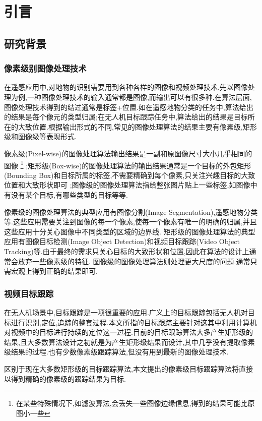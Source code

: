 
\chapter{引言}

\section{研究背景}
\subsection{像素级别图像处理技术}
在遥感应用中,对地物的识别需要用到各种各样的图像和视频处理技术.先以图像处理为例,一种图像处理技术的输入通常都是图像,而输出可以有很多种.在算法层面,图像处理技术得到的结过通常是标签+位置.如在遥感地物分类的任务中,算法给出的结果是每个像元的类型归属;在无人机目标跟踪任务中,算法给出的结果是目标所在的大致位置.根据输出形式的不同,常见的图像处理算法的结果主要有像素级,矩形级和图像级等表现形式.
\par
像素级(Pixel-wise)的图像处理算法输出结果是一副和原图像尺寸大小几乎相同的图像
\footnote{在某些特殊情况下,如滤波算法,会丢失一些图像边缘信息,得到的结果可能比原图小一些}
;矩形级(Box-wise)的图像处理算法的输出结果通常是一个目标的外包矩形(Bounding Box)和目标所属的标签,不需要精确到每个像素,只关注兴趣目标的大致位置和大致形状即可
;图像级的图像处理算法指给整张图片贴上一些标签,如图像中有没有某个目标,有哪些类型的目标等等.
\par
像素级的图像处理算法的典型应用有图像分割(Image Segmentation),遥感地物分类等.这些应用需要关注到图像的每一个像素,使每一个像素有唯一的明确的归属,并且这些应用十分关心图像中不同类型的区域的边界线.
矩形级的图像处理算法的典型应用有图像目标检测(Image Object Detection)和视频目标跟踪(Video Object Tracking)等.由于最终的需求只关心目标的大致形状和位置,因此在算法的设计上通常会放弃一些像素级的特征.
图像级的图像处理算法则处理更大尺度的问题.通常只需宏观上得到正确的结果即可.

\subsection{视频目标跟踪}
在无人机场景中,目标跟踪是一项很重要的应用.广义上的目标跟踪包括无人机对目标进行识别,定位,追踪的整套过程.本文所指的目标跟踪主要针对这其中利用计算机对视频中的目标进行持续的定位这一过程.目前的目标跟踪算法大多产生矩形级的结果,且大多数算法设计之初就是为产生矩形级结果而设计,其中几乎没有提取像素级结果的过程.也有少数像素级跟踪算法,但没有用到最新的图像处理技术.
\par
区别于现在大多数矩形级的目标跟踪算法,本文提出的像素级目标跟踪算法将直接以得到精确的像素级的跟踪结果为目标.

